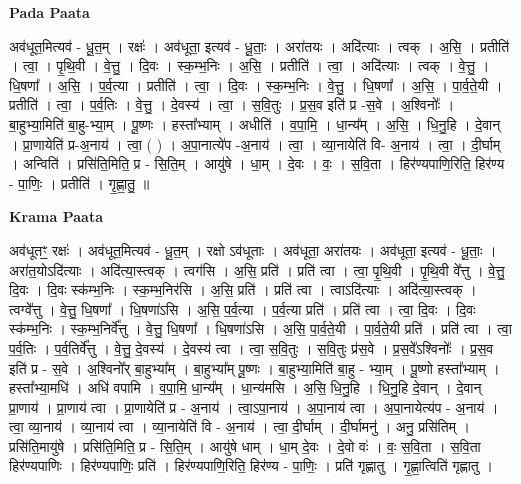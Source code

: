 \documentclass[17pt]{extarticle}
\begin{document}
\textbf{Pada Paata} \newline

अव॑धूत॒मित्यव॑ - धू॒त॒म् । रक्षः॑ । अव॑धूता॒ इत्यव॑ - धू॒ताः॒ । अरा॑तयः । अदि॑त्याः । त्वक् । अ॒सि॒ । प्रतीति॑ । त्वा॒ । पृ॒थि॒वी । वे॒त्तु॒ । दि॒वः । स्क॒म्भ॒निः । अ॒सि॒ । प्रतीति॑ । त्वा॒ । अदि॑त्याः । त्वक् । वे॒त्तु॒ । धि॒षणा᳚ । अ॒सि॒ । प॒र्व॒त्या । प्रतीति॑ । त्वा॒ । दि॒वः । स्क॒म्भ॒निः । वे॒त्तु॒ । धि॒षणा᳚ । अ॒सि॒ । पा॒र्व॒ते॒यी । प्रतीति॑ । त्वा॒ । प॒र्व॒तिः । वे॒त्तु॒ । दे॒वस्य॑ । त्वा॒ । स॒वि॒तुः । प्र॒स॒व इति॑ प्र -स॒वे । अ॒श्विनोः᳚ । बा॒हुभ्या॒मिति॑ बा॒हु-भ्या॒म् । पू॒ष्णः । हस्ता᳚भ्याम् । अधीति॑ । व॒पा॒मि॒ । धा॒न्य᳚म् । अ॒सि॒ । धि॒नु॒हि । दे॒वान् । प्रा॒णायेति॑ प्र-अ॒नाय॑ । त्वा॒ ( ) । अ॒पा॒नात्ये॑प -अ॒नाय॑ । त्वा॒ । व्या॒नायेति॑ वि- अ॒नाय॑ । त्वा॒ । दी॒र्घाम् । अन्विति॑ । प्रसि॑ति॒मिति॒ प्र - सि॒ति॒म् । आयु॑षे । धा॒म् । दे॒वः । वः॒ । स॒वि॒ता । हिर॑ण्यपाणि॒रिति॒ हिर॑ण्य - पा॒णिः॒ । प्रतीति॑ । गृ॒ह्णा॒तु॒ ॥  \newline


\textbf{Krama Paata} \newline

अव॑धूतꣳ॒॒ रक्षः॑ । अव॑धूत॒मित्यव॑ - धू॒त॒म् । रक्षो ऽव॑धूताः । अव॑धूता॒ अरा॑तयः । अव॑धूता॒ इत्यव॑ - धू॒ताः॒ । अरा॑त॒योऽदि॑त्याः । अदि॑त्या॒स्त्वक् । त्वग॑सि । अ॒सि॒ प्रति॑ । प्रति॑ त्वा । त्वा॒ पृ॒थि॒वी । पृ॒थि॒वी वे᳚त्तु । वे॒त्तु॒ दि॒वः । दि॒वः स्क॑म्भ॒निः । स्क॒म्भ॒निर॑सि । अ॒सि॒ प्रति॑ । प्रति॑ त्वा । त्वाऽदि॑त्याः । अदि॑त्या॒स्त्वक् । त्वग्वे᳚त्तु । वे॒त्तु॒ धि॒षणा᳚ । धि॒षणा॑ऽसि । अ॒सि॒ प॒र्व॒त्या । प॒र्व॒त्या प्रति॑ । प्रति॑ त्वा । त्वा॒ दि॒वः । दि॒वः स्क॑म्भ॒निः । स्क॒म्भ॒निर्वे᳚त्तु । वे॒त्तु॒ धि॒षणा᳚ । धि॒षणा॑ऽसि । अ॒सि॒ पा॒र्व॒ते॒यी । पा॒र्व॒ते॒यी प्रति॑ । प्रति॑ त्वा । त्वा॒ प॒र्व॒तिः । प॒र्व॒तिर्वे᳚त्तु । वे॒त्तु॒ दे॒वस्य॑ । दे॒वस्य॑ त्वा । त्वा॒ स॒वि॒तुः । स॒वि॒तुः प्र॑स॒वे । प्र॒स॒वे᳚ऽश्विनोः᳚ । प्र॒स॒व इति॑ प्र - स॒वे । अ॒श्विनो᳚र् बा॒हुभ्या᳚म् । बा॒हुभ्या᳚म् पू॒ष्णः । बा॒हुभ्या॒मिति॑ बा॒हु - भ्या॒म् । पू॒ष्णो हस्ता᳚भ्याम् । हस्ता᳚भ्या॒मधि॑ । अधि॑ वपामि । व॒पा॒मि॒ धा॒न्य᳚म् । धा॒न्य॑मसि । अ॒सि॒ धि॒नु॒हि । धि॒नु॒हि दे॒वान् । दे॒वान् प्रा॒णाय॑ । प्रा॒णाय॑ त्वा । प्रा॒णायेति॑ प्र - अ॒नाय॑ । त्वा॒ऽपा॒नाय॑ । अ॒पा॒नाय॑ त्वा । अ॒पा॒नायेत्य॑प - अ॒नाय॑ । त्वा॒ व्या॒नाय॑ । व्या॒नाय॑ त्वा । व्या॒नायेति॑ वि - अ॒नाय॑ । त्वा॒ दी॒र्घाम् । दी॒र्घामनु॑ । अनु॒ प्रसि॑तिम् । प्रसि॑ति॒मायु॑षे । प्रसि॑ति॒मिति॒ प्र - सि॒ति॒म् । आयु॑षे धाम् । धा॒म् दे॒वः । दे॒वो वः॑ । वः॒ स॒वि॒ता । स॒वि॒ता हिर॑ण्यपाणिः । हिर॑ण्यपाणिः॒ प्रति॑ । हिर॑ण्यपाणि॒रिति॒ हिर॑ण्य - पा॒णिः॒ । प्रति॑ गृह्णातु । गृ॒ह्णा॒त्विति॑ गृह्णातु । \newline
\end{document}
